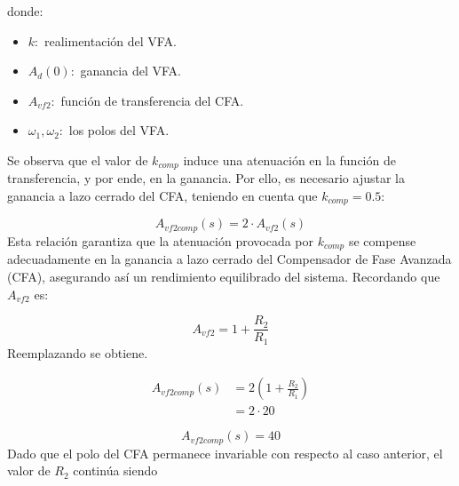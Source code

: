\documentclass[a4paper,12pt]{article}
\begin{document}
\vspace{0.2cm}
\hspace{1mm} donde:
\begin{itemize}
    \item $k:$ realimentación del VFA.
    \item $A_d(0):$ ganancia del VFA.
    \item $A_{vf2}:$ función de transferencia del CFA.
    \item $ \omega_1 , \omega_2 :$ los polos del VFA.
\end{itemize}
\vspace{0.2cm}
\hspace{1mm}Se observa que el valor de $k_{comp}$ induce una atenuación en la función de transferencia, y por ende, en la ganancia. Por ello, es necesario ajustar la ganancia a lazo cerrado del CFA, teniendo en cuenta que $ k_{comp} = 0.5 $:

\begin{equation}
    A_{vf2 comp} (s) = 2\cdot A_{vf2}(s)
\end{equation}
\vspace{0.2cm}
\hspace{1mm}Esta relaci\'on garantiza que la atenuaci\'on provocada por $k_{comp}$ se compense adecuadamente en la ganancia a lazo cerrado del Compensador de Fase Avanzada (CFA), asegurando así un rendimiento equilibrado del sistema. Recordando que $A_{vf2}$ es:

\begin{equation}
    A_{vf2} = 1 + \frac{R_2}{R_1}
\end{equation}
\vspace{0.2cm}
\hspace{1mm}Reemplazando se obtiene.

\begin{equation}
    \begin{aligned}
        A_{vf2 comp} (s) &= 2 \left( 1 + \frac{R_2}{R_1} \right)\\
             &= 2 \cdot 20
    \end{aligned}
\end{equation}

\begin{equation}
    \boxed{
    A_{vf2 comp} (s) = 40
    }
\end{equation}
\vspace{0.2cm}
\hspace{1mm}Dado que el polo del CFA permanece invariable con respecto al caso anterior, el valor de $R_2$ continúa siendo 
\end{document}
